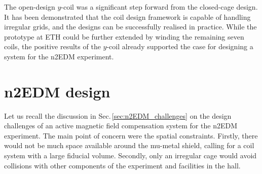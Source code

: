 

The open-design $y$-coil was a significant step forward from the closed-cage design. It has been demonstrated that the coil design framework is capable of handling irregular grids, and the designs can be successfully realised in practice. While the prototype at ETH could be further extended by winding the remaining seven coils, the positive results of the $y$-coil already supported the case for designing a system for the n2EDM experiment.




\section{n2EDM design}
Let us recall the discussion in Sec.\,\ref{sec:n2EDM_challenges} on the design challenges of an active magnetic field compensation system for the n2EDM experiment. The main point of concern were the spatial constraints. Firstly, there would not be much space available around the mu-metal shield, calling for a coil system with a large fiducial volume. Secondly, only an irregular cage would avoid collisions with other components of the experiment and facilities in the hall.

